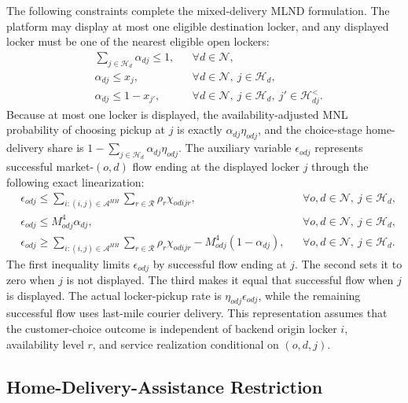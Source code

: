 \documentclass[final,3p,authoryear]{elsarticle}
\begin{document}
The following constraints complete the mixed-delivery MLND formulation.
The platform may display at most one eligible destination locker, and any displayed locker must be one of the nearest eligible open lockers:
\begin{align}
&
\sum_{j\in\mathcal H_d}\alpha_{dj}
\le1,
&&\forall d\in\mathcal N,
\label{app:locker_destination_limit}
\\
&
\alpha_{dj}
\le x_j,
&&\forall d\in\mathcal N,\ j\in\mathcal H_d,
\label{app:locker_destination_open}
\\
&
\alpha_{dj}
\le1-x_{j'},
&&\forall d\in\mathcal N,\ j\in\mathcal H_d,\ j'\in\mathcal H_{dj}^{<}.
\label{app:nearest_locker}
\end{align}
Because at most one locker is displayed, the availability-adjusted MNL probability of choosing pickup at $j$ is exactly $\alpha_{dj}\eta_{odj}$, and the choice-stage home-delivery share is $1-\sum_{j\in\mathcal H_d}\alpha_{dj}\eta_{odj}$.
The auxiliary variable $\epsilon_{odj}$ represents successful market-$(o,d)$ flow ending at the displayed locker $j$ through the following exact linearization:
\begin{align}
&
\epsilon_{odj}
\le
\sum_{i:(i,j)\in\mathcal A^{HH}}
\sum_{r\in\mathcal R}
\rho_r\chi_{odijr},
&&\forall o,d\in\mathcal N,\ j\in\mathcal H_d,
\label{app:epsilon_flow}
\\
&
\epsilon_{odj}
\le M^4_{odj}\alpha_{dj},
&&\forall o,d\in\mathcal N,\ j\in\mathcal H_d,
\label{app:epsilon_display}
\\
&
\epsilon_{odj}
\ge
\sum_{i:(i,j)\in\mathcal A^{HH}}
\sum_{r\in\mathcal R}
\rho_r\chi_{odijr}
-M^4_{odj}(1-\alpha_{dj}),
&&\forall o,d\in\mathcal N,\ j\in\mathcal H_d.
\label{app:epsilon_lower}
\end{align}
The first inequality limits $\epsilon_{odj}$ by successful flow ending at $j$.
The second sets it to zero when $j$ is not displayed.
The third makes it equal that successful flow when $j$ is displayed.
The actual locker-pickup rate is $\eta_{odj}\epsilon_{odj}$, while the remaining successful flow uses last-mile courier delivery.
This representation assumes that the customer-choice outcome is independent of backend origin locker $i$, availability level $r$, and service realization conditional on $(o,d,j)$.

\subsection{Home-Delivery-Assistance Restriction}
\label{app:hd_model}
\end{document}
